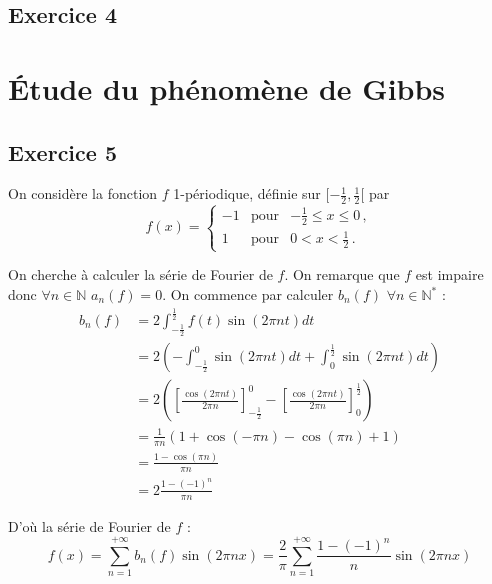 \documentclass[a4paper,11pt]{article}
\begin{document}
\subsection*{Exercice 4}

\section{Étude du phénomène de Gibbs}

\subsection*{Exercice 5}
	On considère la fonction $f$ 1-périodique, définie sur $[-\frac{1}{2}, \frac{1}{2}[$ par
	\begin{equation*}
	f(x) = \left\{\begin{array}{lll}
	-1 & \text{pour} & -\frac{1}{2} \le x \le 0 \,,\\
	1 & \text{pour} & 0< x < \frac{1}{2} \,.
	\end{array}\right.
	\end{equation*}

	On cherche à calculer la série de Fourier de $f$. On remarque que $f$ est impaire donc $\forall n \in \mathbb{N} $ $a_{n}(f) = 0$.
	On commence par calculer $b_{n}(f)$ $\forall n \in \mathbb{N}^{*}$ :
	\begin{align*}
		b_{n}(f)
		& = 2 \int_{-\frac{1}{2}}^{\frac{1}{2}} f(t) \sin (2 \pi n t) dt \\
		& = 2 \left ( - \int_{-\frac{1}{2}}^{0} \sin (2 \pi n t) dt + \int_{0}^{\frac{1}{2}} \sin (2 \pi n t) dt \right ) \\
		& = 2 \left ( \left [ \frac{\cos ( 2 \pi n t)}{2 \pi n} \right ]_{-\frac{1}{2}}^{0} - \left [ \frac{\cos ( 2 \pi n t)}{2 \pi n} \right ]_{0}^{\frac{1}{2}} \right ) \\
		& = \frac{1}{\pi n} \left ( 1 + \cos (- \pi n) - \cos ( \pi n) + 1 \right ) \\
		& = \frac{1 - \cos (\pi n)}{\pi n} \\
		& = 2 \frac{1-(-1)^{n}}{\pi n}
	\end{align*}

	D'où la série de Fourier de $f$ :
	\begin{equation*}
		f(x) = \sum_{n=1}^{+ \infty} b_{n}(f) \sin (2 \pi n x) = \frac{2}{\pi} \sum_{n=1}^{+ \infty} \frac{1-(-1)^{n}}{n} \sin (2 \pi n x)
	\end{equation*}
\end{document}
